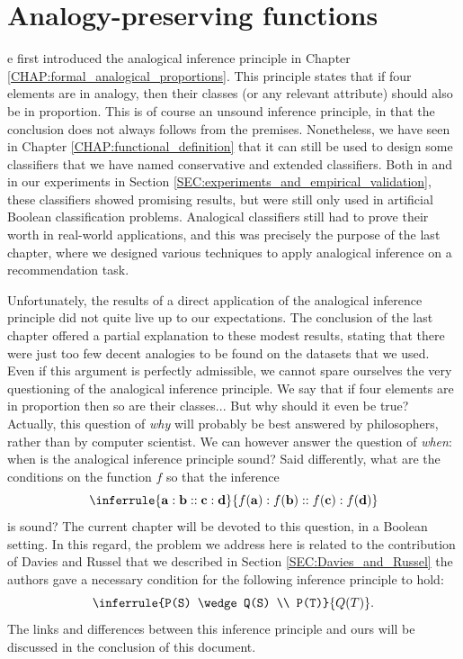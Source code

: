 \chapter{Analogy-preserving functions}
\label{CHAP:analogy_preserving_functions}
\localtableofcontents*
\vspace*{\baselineskip}

e first introduced the analogical inference principle in Chapter
\ref{CHAP:formal_analogical_proportions}. This principle states that if four
elements are in analogy, then their classes (or any relevant attribute) should
also be in proportion. This is of course an unsound inference principle, in
that the conclusion does not always follows from the premises. Nonetheless, we
have seen in Chapter \ref{CHAP:functional_definition} that it can still be used
to design some classifiers that we have named conservative and extended
classifiers.  Both in \cite{BayMicDelIJCAI07} and in our experiments in Section
\ref{SEC:experiments_and_empirical_validation}, these classifiers
showed promising results, but were still only used in artificial Boolean
classification problems. Analogical classifiers still had to prove their worth
in real-world applications, and this was precisely the purpose of the last
chapter, where we designed various techniques to apply analogical inference on
a recommendation task.

Unfortunately, the results of a direct application of the analogical inference
principle did not quite live up to our expectations. The conclusion of the last
chapter offered a partial explanation to these modest results, stating that
there were just too few decent analogies to be found on the datasets that we
used. Even if this argument is perfectly admissible, we cannot spare ourselves
the very questioning of the analogical inference principle. We say that if
four elements are in proportion then so are their classes... But why should it
even be true? Actually, this question of \textit{why} will probably be best
answered by philosophers, rather than by computer scientist. We can however
answer the question of \textit{when}: when is the analogical inference
principle sound? Said differently, what are the conditions on the function $f$
so that the inference
$$
\inferrule{\mathbf{a} : \mathbf{b} :: \mathbf{c} : \mathbf{d}}{ f(\mathbf{a}) :
f(\mathbf{b}) :: f(\mathbf{c}) : f(\mathbf{d})}
$$
is sound? The current chapter will be devoted to this question, in a Boolean
setting. In this regard,
the problem we address here is related to the contribution of Davies and Russel
that we described in Section \ref{SEC:Davies_and_Russel} the authors gave a
necessary condition for the following inference principle to hold:
$$\inferrule{P(S) \wedge Q(S) \\ P(T)}{Q(T)}.$$
The links and differences between this inference principle and ours will be
discussed in the conclusion of this document.

